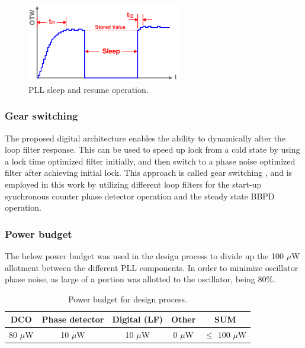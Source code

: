 			\begin{figure}[htb!]
			        \centering
			        \includegraphics[width=0.6\textwidth, angle=0]{./figs/design/pll_sleep}
			    \caption{PLL sleep and resume operation.}
			    \label{fig:pll_sleep}
			\end{figure}


	\subsubsection{Gear switching}
	The proposed digital architecture enables the ability to dynamically alter the loop filter response. This can be used to speed up lock from a cold state by using a lock time optimized filter initially, and then switch to a phase noise optimized filter after achieving initial lock. This approach is called gear switching \cite{staszewski_balsara_2007}, and is employed in this work by utilizing different loop filters for the start-up synchronous counter phase detector operation and the steady state BBPD operation.
	
	\subsubsection{Power budget}
	The below power budget was used in the design process to divide up the 100 $\mu$W allotment between the different PLL components. In order to minimize oscillator phase noise, as large of a portion was allotted to the oscillator, being 80\%. 
		\begin{table}[htb!]
			\centering
			\def\arraystretch{1.5}		
			\setlength\arrayrulewidth{0.75pt}
			\setlength{\tabcolsep}{1em} %
			\begin{tabular}{|c|c|c|c|c|}
				\hline 
				\rule[-1ex]{0pt}{2.5ex} \cellcolor{gray!40}\textbf{DCO} & \cellcolor{gray!40}\textbf{Phase detector} & \cellcolor{gray!40}\textbf{Digital (LF)}& \cellcolor{gray!40}\textbf{Other} & \cellcolor{gray!40}\textbf{SUM} \\ 
				\hline 
				\rule[-1ex]{0pt}{2.5ex} 80 $\mu$W& 10 $\mu$W &  10 $\mu$W  & 0 $ \mu$W & $\leq$ 100  $\mu$W\\ 
				\hline 
			\end{tabular} 
			\caption{Power budget for design process.}
			\label{tab:pow_budget}
		\end{table}   




